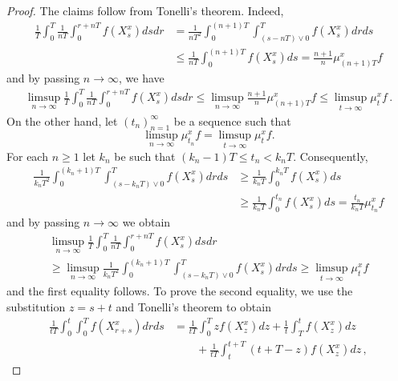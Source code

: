\documentclass[10pt,a4paper]{amsart}
\begin{document}
\begin{proof}
    The claims follow from Tonelli's theorem. Indeed,
    \begin{align*}
        \frac{1}{T}\int_0^T \frac{1}{nT} \int_0^{r + nT} f(X_s^x)dsdr &= \frac{1}{nT^2} \int_0^{(n+1)T} \int_{(s-nT)\vee 0}^Tf(X_s^x)dr ds \\
        &\leq \frac{1}{nT} \int_0^{(n+1)T}f(X_s^x)ds = \frac{n+1}{n} \mu_{(n+1)T}^xf 
    \end{align*}
and by passing $n \to \infty$, we have 
    \begin{align*}
  \limsup_{n \to \infty} \frac{1}{T}\int_0^T \frac{1}{nT} \int_0^{r + nT} f(X_s^x)dsdr 
        \leq 
        \limsup_{n \to \infty} \frac{n+1}{n} \mu_{(n+1)T}^xf 
        \leq \limsup_{t \to \infty} \mu_{t}^xf \,.
    \end{align*}
On the other hand, let $(t_n)_{n = 1}^\infty$ be a sequence such that 
$$
\limsup_{n \to \infty} \mu_{t_n}^xf = \limsup_{t \to \infty}  \mu_{t}^xf .
$$ 
For each $n \geq 1$ let $k_n$ be such that 
$(k_n -1)T \leq t_n < k_n T$. 
Consequently, 
    \begin{align*}
        \frac{1}{k_n T^2} \int_0^{(k_n+1)T} \int_{(s-k_nT)\vee 0}^Tf(X_s^x)dr ds 
        &\geq \frac{1}{k_nT} \int_0^{k_nT}f(X_s^x)ds \\
        &\geq \frac{1}{k_nT} \int_0^{t_n}f(X_s^x)ds  
        =  \frac{t_n}{k_nT} \mu_{t_n}^xf
    \end{align*}
    and by passing $n \to \infty$ we obtain
\begin{multline*}
  \limsup_{n \to \infty} \frac{1}{T}\int_0^T \frac{1}{nT} \int_0^{r + nT} f(X_s^x)dsdr \\
  \geq 
 \limsup_{n \to \infty}  \frac{1}{k_n T^2} \int_0^{(k_n+1)T} \int_{(s-k_nT)\vee 0}^Tf(X_s^x)dr ds 
        \geq 
         \limsup_{t \to \infty} \mu_{t}^xf 
\end{multline*}
and the first equality follows. To prove the second equality, we 
use the substitution $z = s+t$ and Tonelli's theorem to obtain
\begin{align*}
\frac{1}{tT}
\int_0^t\int_0^T f(X_{r+s}^x)drds &= \frac{1}{tT} \int_0^T zf(X_z^x)dz + \frac{1}{t}\int_T^t f(X_z^x)dz
\\ &\qquad + \frac{1}{tT} \int_t^{t + T} (t+T-z)f(X_z^x)dz \,,
\end{align*}



\end{proof}
\end{document}
